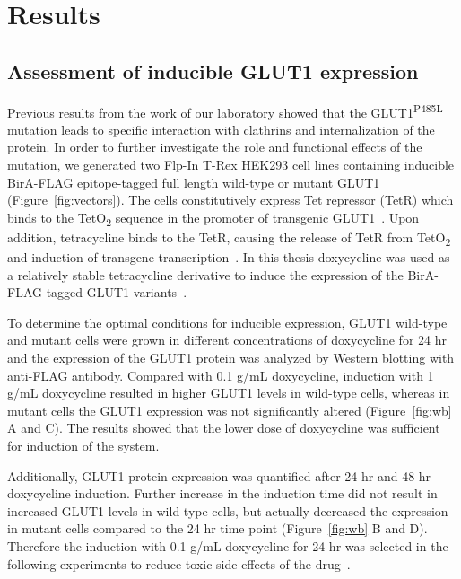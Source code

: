 
\chapter{Results} %
\label{Chapter3} %
\section{Assessment of inducible GLUT1 expression}
Previous results from the work of our laboratory showed that the GLUT1\textsuperscript{P485L} mutation leads to specific interaction with clathrins and internalization of the protein. In order to further investigate the role and functional effects of the mutation, we generated two Flp-In T-Rex HEK293 cell lines containing inducible BirA-FLAG epitope-tagged full length wild-type or mutant GLUT1 (Figure~\ref{fig:vectors}). The cells constitutively express Tet repressor (TetR) which binds to the TetO\textsubscript{2} sequence in the promoter of transgenic GLUT1~\cite{Hillen}. Upon addition, tetracycline binds to the TetR, causing the release of TetR from TetO\textsubscript{2} and induction of transgene transcription~\cite{Hillen}. In this thesis doxycycline was used as a relatively stable tetracycline derivative to induce the expression of the BirA-FLAG tagged GLUT1 variants~\cite{Xu}.

To determine the optimal conditions for inducible expression, GLUT1 wild-type and mutant cells were grown in different concentrations of doxycycline for 24 hr and the expression of the GLUT1 protein was analyzed by Western blotting with anti-FLAG antibody. Compared with 0.1 \textmu g/mL doxycycline, induction with 1 \textmu g/mL doxycycline resulted in higher GLUT1 levels in wild-type cells, whereas in mutant cells the GLUT1 expression was not significantly altered (Figure~\ref{fig:wb} A and C). The results showed that the lower dose of doxycycline was sufficient for induction of the system. 

Additionally, GLUT1 protein expression was quantified after 24 hr and 48 hr doxycycline induction. Further increase in the induction time did not result in increased GLUT1 levels in wild-type cells, but actually decreased the expression in mutant cells compared to the 24 hr time point (Figure~\ref{fig:wb} B and D). Therefore the induction with 0.1 \textmu g/mL doxycycline for 24 hr was selected in the following experiments to reduce toxic side effects of the drug~\cite{Zeltser}.

